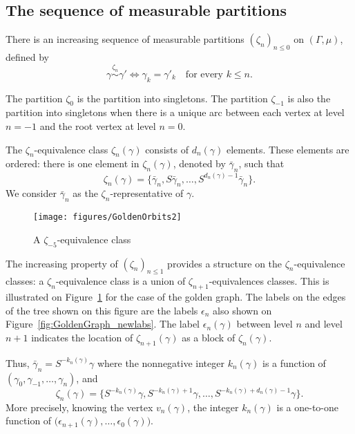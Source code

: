 \documentclass[12pt,a4paper]{article}
\begin{document}
\subsection{The sequence of measurable partitions}

There is an increasing sequence of measurable partitions ${(\zeta_n)}_{n \leq 0}$ 
on $(\Gamma, \mu)$, defined by 
$$
\boxed{\gamma \overset{\zeta_n}{\sim} \gamma' 
\iff \gamma_k=\gamma'_k \quad\text{for every $k \leq n$}}.
$$ 

The partition $\zeta_0$ is the partition into singletons. 
The partition $\zeta_{-1}$ is also the partition into singletons 
when there is a unique arc between each vertex at level $n=-1$ and the root vertex 
at level $n=0$.  

The $\zeta_n$-equivalence class $\zeta_n(\gamma)$ consists of $d_n(\gamma)$ elements. 
These elements are ordered: there is one element in $\zeta_n(\gamma)$, denoted by 
$\bar\gamma_n$, such that 
$$
\boxed{\zeta_n(\gamma)= \{\bar\gamma_n, S\bar\gamma_n, \ldots, S^{d_n(\gamma)-1}\bar\gamma_n\}}.
$$
We consider $\bar\gamma_n$ as the $\zeta_n$-representative of $\gamma$.

\begin{figure}[!h]
\centering
	\texttt{[image: figures/GoldenOrbits2]}
\caption{A $\zeta_{-5}$-equivalence class}
\label{fig:GoldenOrbits}
\end{figure}


The increasing property of ${(\zeta_n)}_{n \leq 1}$ provides a structure 
on the $\zeta_{n}$-equivalence classes: a $\zeta_n$-equivalence class 
is a union of $\zeta_{n+1}$-equivalences classes. 
This is illustrated on Figure~\ref{fig:GoldenOrbits} for the case of the golden graph. 
The labels on the edges of the tree shown on this figure are the labels $\epsilon_n$ 
also shown on Figure~\ref{fig:GoldenGraph_newlabs}. 
The label $\epsilon_n(\gamma)$ between level $n$ and level $n+1$ indicates the location of 
$\zeta_{n+1}(\gamma)$ as a block of $\zeta_n(\gamma)$. 


Thus, $\boxed{\bar\gamma_n = S^{-k_n(\gamma)}\gamma}$ where the nonnegative integer $k_n(\gamma)$ 
is a function of $(\gamma_{0}, \gamma_{-1}, \ldots, \gamma_n)$, and 
$$
\zeta_n(\gamma) = \{S^{-k_n(\gamma)}\gamma, S^{-k_n(\gamma)+1}\gamma, 
\ldots, S^{-k_n(\gamma)+d_n(\gamma)-1}\gamma \}.
$$ 
More precisely, knowing the vertex $v_n(\gamma)$, the integer $k_n(\gamma)$ is 
a one-to-one function of $\bigl(\epsilon_{n+1}(\gamma), \ldots, \epsilon_0(\gamma)\bigr)$. 
\end{document}
